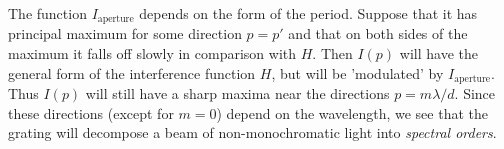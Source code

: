\documentclass[12pt,twoside,english]{book}
\renewcommand{\~}{\perispomeni}%
\numberwithin{equation}{section}
\numberwithin{figure}{section}
\begin{document}

The function $I_{\text{aperture}}$ depends on the form of the period. Suppose that it has principal maximum for some direction $p=p'$ and that on both sides of the maximum it falls off slowly in comparison with $H$. Then $I\left(p\right)$ will have the general form of the interference function $H$, but will be 'modulated' by $I_{\text{aperture}}$. Thus $I\left(p\right)$ will still have a sharp maxima near the directions $p=m\lambda/d$. Since these directions (except for $m=0$) depend on the wavelength, we see that the grating will decompose a beam of non-monochromatic light into \emph{spectral orders}.
\end{document}
